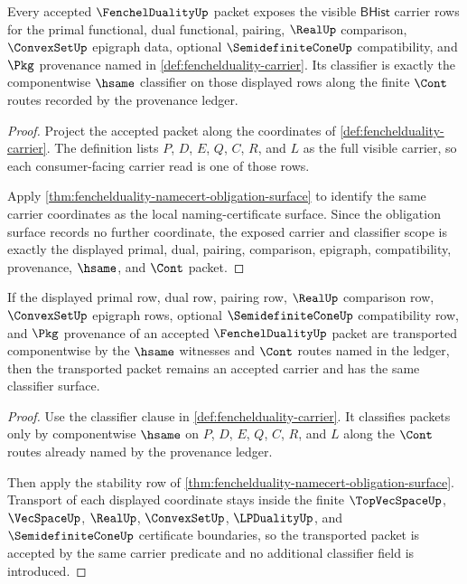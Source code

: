 \begin{theorem}
\label{thm:fenchelduality-carrier-classifier-scope}
Every accepted $\FenchelDualityUp$ packet exposes the visible $\mathsf{BHist}$
carrier rows for the primal functional, dual functional, pairing, $\RealUp$
comparison, $\ConvexSetUp$ epigraph data, optional $\SemidefiniteConeUp$
compatibility, and $\Pkg$ provenance named in
\autoref{def:fenchelduality-carrier}. Its classifier is exactly the
componentwise $\hsame$ classifier on those displayed rows along the finite
$\Cont$ routes recorded by the provenance ledger.
\end{theorem}
\begin{proof}
Project the accepted packet along the coordinates of
\autoref{def:fenchelduality-carrier}. The definition lists $P$, $D$, $E$, $Q$,
$C$, $R$, and $L$ as the full visible carrier, so each consumer-facing carrier
read is one of those rows.

Apply \autoref{thm:fenchelduality-namecert-obligation-surface} to identify the
same carrier coordinates as the local naming-certificate surface. Since the
obligation surface records no further coordinate, the exposed carrier and
classifier scope is exactly the displayed primal, dual, pairing, comparison,
epigraph, compatibility, provenance, $\hsame$, and $\Cont$ packet.
\end{proof}

\begin{theorem}
\label{thm:fenchelduality-hsame-stability-scope}
If the displayed primal row, dual row, pairing row, $\RealUp$ comparison row,
$\ConvexSetUp$ epigraph rows, optional $\SemidefiniteConeUp$ compatibility row,
and $\Pkg$ provenance of an accepted $\FenchelDualityUp$ packet are transported
componentwise by the $\hsame$ witnesses and $\Cont$ routes named in the ledger,
then the transported packet remains an accepted carrier and has the same
classifier surface.
\end{theorem}
\begin{proof}
Use the classifier clause in \autoref{def:fenchelduality-carrier}. It classifies
packets only by componentwise $\hsame$ on $P$, $D$, $E$, $Q$, $C$, $R$, and $L$
along the $\Cont$ routes already named by the provenance ledger.

Then apply the stability row of
\autoref{thm:fenchelduality-namecert-obligation-surface}. Transport of each
displayed coordinate stays inside the finite $\TopVecSpaceUp$, $\VecSpaceUp$,
$\RealUp$, $\ConvexSetUp$, $\LPDualityUp$, and $\SemidefiniteConeUp$
certificate boundaries, so the transported packet is accepted by the same
carrier predicate and no additional classifier field is introduced.
\end{proof}

